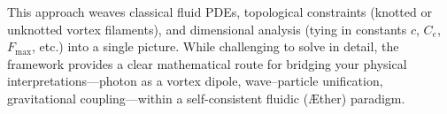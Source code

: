 This approach weaves classical fluid PDEs, topological constraints (knotted or unknotted vortex filaments), and dimensional analysis (tying in constants \(c\), \(C_e\), \(F_{\max}\), etc.) into a single picture. While challenging to solve in detail, the framework provides a clear mathematical route for bridging your physical interpretations—photon as a vortex dipole, wave–particle unification, gravitational coupling—within a self-consistent fluidic (Æther) paradigm.
